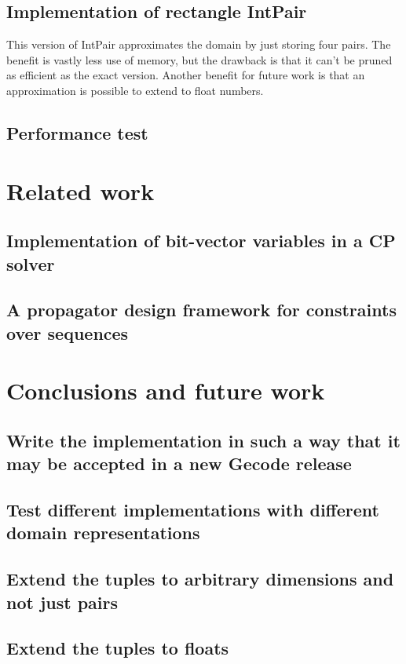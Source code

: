 \documentclass[a4paper,11pt]{article}
\begin{document}
\subsection{Implementation of rectangle IntPair}
This version of IntPair approximates the domain by just storing four pairs. The benefit is vastly less use of memory, but the drawback is that it can't be pruned as efficient as the exact version. Another benefit for future work is that an approximation is possible to extend to float numbers.

\subsection{Performance test}

\section{Related work}
\subsection{Implementation of bit-vector variables in a CP solver}
\subsection{A propagator design framework for constraints over sequences}

\section{Conclusions and future work}

\subsection{Write the implementation in such a way that it may be accepted in a new Gecode release}
\subsection{Test different implementations with different domain representations}
\subsection{Extend the tuples to arbitrary dimensions and not just pairs}
\subsection{Extend the tuples to floats}
\end{document}
